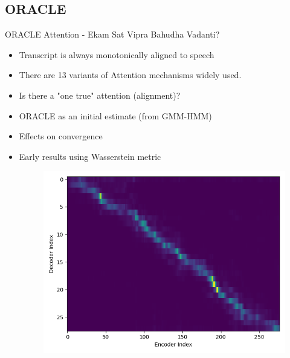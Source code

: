 \documentclass[10pt]{beamer}
\begin{document}
\subsection{ORACLE}
\begin{frame}[fragile]{ORACLE Attention - Ekam Sat Vipra Bahudha Vadanti?}

\begin{itemize}
	\item Transcript is always monotonically aligned to speech
	\item There are 13 variants of Attention mechanisms widely used.
	\item Is there a "one true" attention (alignment)?
	\item ORACLE as an initial estimate (from GMM-HMM)
	\item Effects on convergence
	\item Early results using Wasserstein metric
	\begin{figure}
		\includegraphics[height=0.4\textheight]{images/oracle_sh.png}
	\end{figure}
\end{itemize}
\end{frame}
\end{document}
